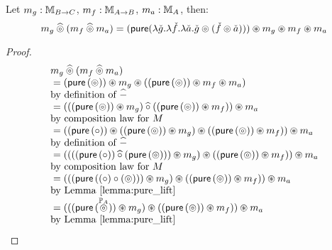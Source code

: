 \begin{lemma}\label{lemma:pappl_comp_appl}
Let $m_g:\mathbb{M}_{B\rightarrow C}$, $m_f:\mathbb{M}_{A\rightarrow B}$, $m_a:\mathbb{M}_{A}$, then:
$$
m_g \mathbin{\widehat{\circledcirc}} (m_f \mathbin{\widehat{\circledcirc}} m_a)
 = (\mathsf{pure} (\lambda \check{g}. \lambda \check{f}. \lambda \check{a}. \check{g} \circledcirc (\check{f}\circledcirc \check{a}))) \circledast m_g \circledast m_f \circledast m_a
$$
\end{lemma}
\begin{proof}



$$
\begin{array}{ll}
m_g \mathbin{\widehat{\circledcirc}} (m_f \mathbin{\widehat{\circledcirc}} m_a) \\
{}= (\mathsf{pure}\, (\circledcirc)) \circledast m_g \circledast ((\mathsf{pure}\, (\circledcirc)) \circledast m_f \circledast m_a) \\
 \mbox{by definition of }\mathbin{\widehat{-}}\\
{}= (  ((\mathsf{pure}\, (\circledcirc)) \circledast m_g) \mathbin{\widehat{\circ}} ((\mathsf{pure}\, (\circledcirc)) \circledast m_f)  ) \circledast m_a \\
 \mbox{by composition law for }M \\
{}= (  (\mathsf{pure}\, (\circ)) \circledast  ((\mathsf{pure}\, (\circledcirc)) \circledast m_g) \circledast ((\mathsf{pure}\, (\circledcirc)) \circledast m_f)  ) \circledast m_a \\
 \mbox{by definition of }\mathbin{\widehat{-}}\\
{}= (  ( ((\mathsf{pure}\, (\circ)) \mathbin{\widehat{\circ}}  (\mathsf{pure}\, (\circledcirc))) \circledast m_g ) \circledast ((\mathsf{pure}\, (\circledcirc)) \circledast m_f)  ) \circledast m_a \\
 \mbox{by composition law for }M \\
{}= (  ( (\mathsf{pure}\, ((\circ) \circ (\circledcirc)) ) \circledast m_g ) \circledast ((\mathsf{pure}\, (\circledcirc)) \circledast m_f)  ) \circledast m_a\\
 \mbox{by Lemma \ref{lemma:pure_lift}}\\
{}= (  ( (\mathsf{pure}\, (\stackrel{\mathbb{P}_{A}}{\circledcirc}) ) \circledast m_g ) \circledast ((\mathsf{pure}\, (\circledcirc)) \circledast m_f)  ) \circledast m_a\\
 \mbox{by Lemma \ref{lemma:pure_lift}}\\
\end{array}
$$




\end{proof}
